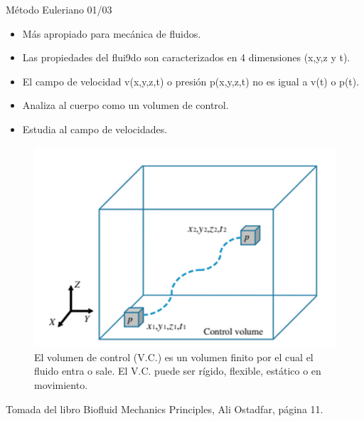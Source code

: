 \begin{frame}{Método Euleriano 01/03}
\justifying
\begin{itemize}
\item Más apropiado para mecánica de fluidos.
\item Las propiedades del flui9do son caracterizados en 4 dimensiones (x,y,z y t).
\item El campo de velocidad v(x,y,z,t) o presión p(x,y,z,t) no es igual a v(t) o p(t).
\item Analiza al cuerpo como un volumen de control.
\item Estudia al campo de velocidades.
\end{itemize}
\begin{figure}[H]
\centering
\includegraphics[scale=0.2]{Section_Files/picmanuel/03.png}
\caption{El volumen de control (V.C.) es un volumen finito por el cual el fluido entra o sale. El V.C. puede ser rígido, flexible, estático o en movimiento.}
\label{fig: Figura2-Fig0403-00}
\end{figure}
{\tiny Tomada del libro Biofluid Mechanics Principles, Ali Ostadfar, página 11.}
\end{frame}

